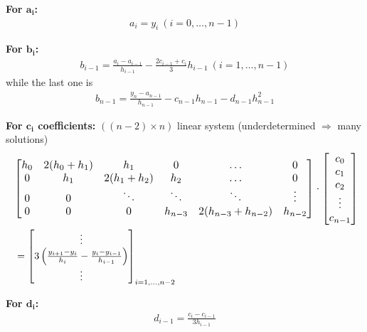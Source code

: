 \begin{snugshade*}
    \textbf{For $\mathbf{a_i}$:}
    \begin{align}
        \label{spline-a}
        a_i = y_i\ (i=0,\ldots,n-1)
    \end{align}

    \textbf{For $\mathbf{b_i}$:}
    \begin{align}
        \label{spline-b}
        b_{i-1}=\frac{a_i-a_{i-1}}{h_{i-1}}-\frac{2c_{i-1}+c_i}{3}h_{i-1}\ (i=1,\ldots,n-1)
    \end{align}
    while the last one is
    \begin{align}
        \label{spline-bn}
        b_{n-1} = \frac{y_n - a_{n-1}}{h_{n-1}}-c_{n-1}h_{n-1}-d_{n-1}h_{n-1}^2
    \end{align}

    \textbf{For $\mathbf{c_i}$ coefficients:} $((n-2)\times n)$ linear system
    (underdetermined $\Rightarrow$ many solutions)
    \begin{align*}
        \ & \resizebox{\columnwidth}{!}{$
        \begin{bmatrix}
            h_0 & 2(h_0 + h_1) & h_1          & 0       & \hdots               & 0       \\
            0   & h_1          & 2(h_1 + h_2) & h_2     & \hdots               & 0       \\
            0   & 0            & \ddots       & \ddots  & \ddots               & \vdots  \\
            0   & 0            & 0            & h_{n-3} & 2(h_{n-3} + h_{n-2}) & h_{n-2}
        \end{bmatrix}\cdot
        \begin{bmatrix}
            c_0    \\
            c_1    \\
            c_2    \\
            \vdots \\
            c_{n-1}
        \end{bmatrix}
        $} \\
        \ & =
        \begin{bmatrix}
            \vdots                                                                \\
            3\left(\frac{y_{i+1} - y_i}{h_i}-\frac{y_i - y_{i-1}}{h_{i-1}}\right) \\
            \vdots
        \end{bmatrix}_{i=1,\ldots,n-2}
    \end{align*}

    \textbf{For $\mathbf{d_i}$:}
    \begin{align}
        \label{spline-d}
        d_{i-1} = \frac{c_i - c_{i-1}}{3h_{i-1}}
    \end{align}
\end{snugshade*}

